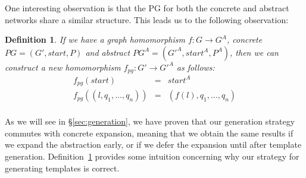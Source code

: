 \documentclass[numbers, 10pt, preprint]{sigplanconf}
\renewcommand{\path}[2]{ #1 \mapsto \ensuremath{#2} }
\newtheorem{defn}{Definition}[section]
\begin{document}
One interesting observation is that the PG for both the concrete and abstract networks share a similar structure. This leads us to the following observation:

\begin{defn}
\label{def:homomorphism}
If we have a graph homomorphism $f : G \rightarrow G^A$, concrete $PG = (G',\mathit{start},P)$ and abstract $PG^A = (G'^A, \mathit{start}^A, P^A)$, then we can construct a new homomorphism $f_{pg} : G' \rightarrow G'^A$ as follows:
\[ \begin{array}{rcl}
  f_{pg}( \mathit{start} ) & = & \mathit{start}^A  \\
  f_{pg}( (l,q_1,\ldots,q_n) ) & = & (f(l),q_1,\ldots,q_n) \\
\end{array} \]
\end{defn}

As we will see in \S\ref{sec:generation}, we have proven that our generation strategy commutes with concrete expansion, meaning that we obtain the same results if we expand the abstraction early, or if we defer the expansion until after template generation.
%
Definition~\ref{def:homomorphism} provides some intuition concerning why our strategy for generating templates is correct.


\newcommand{\state}[4]{\node[state,#3](#1)[#4]{#2};}
\newcommand{\transition}[4]{\path[->] (#1) edge [#4] node {#3} (#2);}
\end{document}
